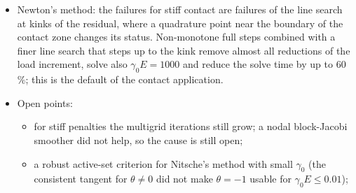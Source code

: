 \documentclass[11pt,a4paper]{article}
\begin{document}
\begin{itemize}
    most accurate for $\varepsilon h/E\approx20$.
  \item Newton's method: the failures for stiff contact are failures of the line search at kinks of
    the residual, where a quadrature point near the boundary of the contact zone changes its
    status. Non-monotone full steps combined with a finer line search that steps up to the kink
    remove almost all reductions of the load increment, solve also $\gamma_0E=1000$ and reduce the
    solve time by up to 60\,\%; this is the default of the contact application.
  \item Open points:
    \begin{itemize}
      \item for stiff penalties the multigrid iterations still grow; a nodal block-Jacobi smoother
        did not help, so the cause is still open;
      \item a robust active-set criterion for Nitsche's method with small $\gamma_0$ (the
        consistent tangent for $\theta\neq0$ did not make $\theta=-1$ usable for
        $\gamma_0E\le0.01$);
    \end{itemize}
\end{itemize}
\end{document}
